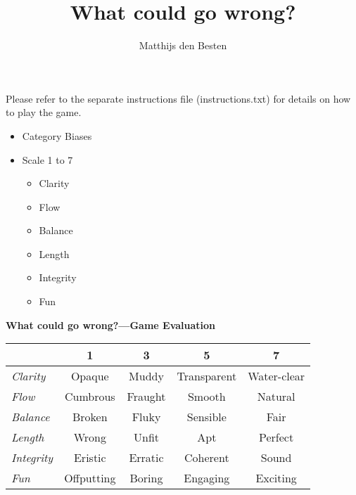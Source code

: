 \documentclass[grid,avery5371]{flashcards}
\title{What could go wrong?}
\author{Matthijs den Besten}
\begin{document}

\begin{flashcard}{
  Please refer to the separate instructions file (instructions.txt) for details on how to play the game.
}

\begin{flashcard}{
    \begin{itemize}\tiny \setlength{\itemsep}{.1ex}
        \item Category Biases
        \item Scale 1 to 7
        \begin{multicols}{3}
        \begin{itemize}
            \item Clarity
            \item Flow
            \item Balance
            \item Length
            \item Integrity
            \item Fun
        \end{itemize}
        \end{multicols}
    \end{itemize}
    }
    {\bf\small What could go wrong?---Game Evaluation}
    \small
    \begin{tabular}{l|c|c|c|c|}
        & 1 & 3 & 5 & 7\\
    \hline
    {\em Clarity} & Opaque & Muddy & Transparent & Water-clear \\
    {\em Flow} & Cumbrous & Fraught & Smooth & Natural \\
    {\em Balance} & Broken & Fluky & Sensible & Fair\\
    {\em Length} & Wrong & Unfit & Apt & Perfect \\
    {\em Integrity} & Eristic & Erratic & Coherent & Sound \\
    {\em Fun} & Offputting & Boring & Engaging & Exciting \\
    \hline
    \end{tabular}
\end{flashcard}



\end{flashcard}
\end{document}
